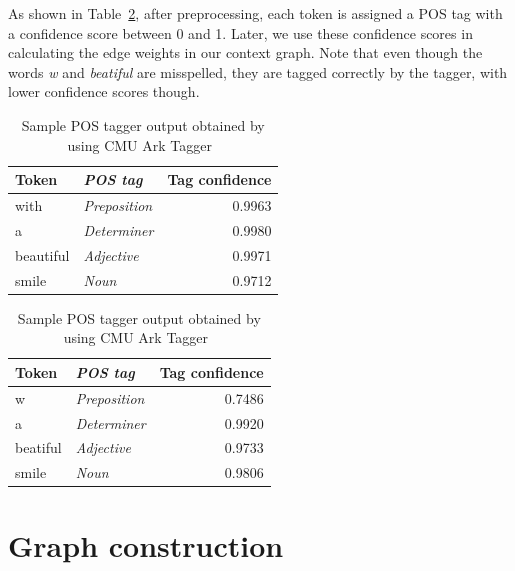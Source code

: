 \documentclass[a4paper,onesided,12pt]{report}
\begin{document}
As shown in Table~\ref{tab:postags}, after preprocessing, each token is assigned a POS tag with a confidence score between 0 and 1. Later, we use these confidence scores in calculating the edge weights in our context graph. Note that even though the words \emph{w} and\emph{ beatiful} are misspelled, they are tagged correctly by the tagger, with lower confidence scores though.

\begin{table}[htbp]
\caption{Sample POS tagger output obtained by using CMU Ark Tagger~\cite{owoputi2013improved,Gimpel:2011:PTT:2002736.2002747}}
\begin{minipage}{.5\linewidth}
\begin{tabular}[h]{|l>{\itshape}lr|}
 \hline
Token & POS tag & Tag confidence \\
 \hline
with & Preposition & 0.9963 \\
 \hline
a & Determiner & 0.9980 \\
 \hline
beautiful & Adjective & 0.9971 \\
 \hline
smile & Noun & 0.9712 \\
 \hline
\end{tabular}
\end{minipage}
\begin{minipage}{.5\linewidth}
\begin{tabular}[h]{|l>{\itshape}lr|}
 \hline
Token & POS tag & Tag confidence \\
 \hline
w & Preposition & 0.7486 \\
 \hline
a & Determiner & 0.9920 \\
 \hline
beatiful & Adjective & 0.9733 \\
 \hline
smile & Noun & 0.9806 \\
 \hline
\end{tabular}
\end{minipage}
\label{tab:postags}
\end{table}

\section{Graph construction}
\end{document}
